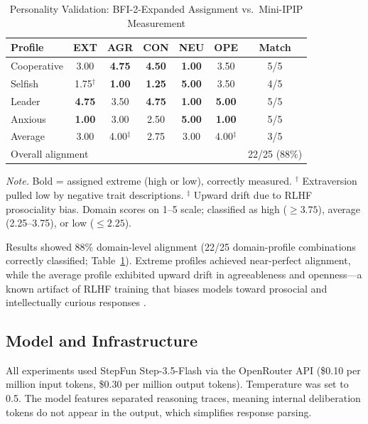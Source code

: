 \documentclass[12pt, a4paper]{article}
\begin{document}
\begin{table}[H]
\centering
\caption{Personality Validation: BFI-2-Expanded Assignment vs.\ Mini-IPIP Measurement}
\label{tab:validation}
\begin{tabular}{lcccccc}
\toprule
Profile & EXT & AGR & CON & NEU & OPE & Match \\
\midrule
Cooperative & 3.00 & \textbf{4.75} & \textbf{4.50} & \textbf{1.00} & 3.50 & 5/5 \\
Selfish & 1.75$^\dagger$ & \textbf{1.00} & \textbf{1.25} & \textbf{5.00} & 3.50 & 4/5 \\
Leader & \textbf{4.75} & 3.50 & \textbf{4.75} & \textbf{1.00} & \textbf{5.00} & 5/5 \\
Anxious & \textbf{1.00} & 3.00 & 2.50 & \textbf{5.00} & \textbf{1.00} & 5/5 \\
Average & 3.00 & 4.00$^\ddagger$ & 2.75 & 3.00 & 4.00$^\ddagger$ & 3/5 \\
\midrule
\multicolumn{6}{l}{Overall alignment} & 22/25 (88\%) \\
\bottomrule
\end{tabular}

\medskip
\footnotesize
\textit{Note.} Bold = assigned extreme (high or low), correctly measured. $^\dagger$ Extraversion pulled low by negative trait descriptions. $^\ddagger$ Upward drift due to RLHF prosociality bias. Domain scores on 1--5 scale; classified as high ($\geq 3.75$), average (2.25--3.75), or low ($\leq 2.25$).
\end{table}

Results showed 88\% domain-level alignment (22/25 domain-profile combinations correctly classified; Table~\ref{tab:validation}). Extreme profiles achieved near-perfect alignment, while the average profile exhibited upward drift in agreeableness and openness---a known artifact of RLHF training that biases models toward prosocial and intellectually curious responses \citep{salecha2024social}.

\subsection{Model and Infrastructure}

All experiments used StepFun Step-3.5-Flash via the OpenRouter API (\$0.10 per million input tokens, \$0.30 per million output tokens). Temperature was set to 0.5. The model features separated reasoning traces, meaning internal deliberation tokens do not appear in the output, which simplifies response parsing.
\end{document}
